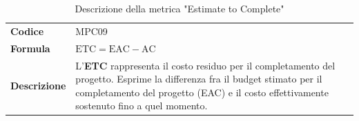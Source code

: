 \documentclass[a4paper,12pt]{article}
\begin{document}
            {\renewcommand{\arraystretch}{1.4}
            \begin{table}[H]
            \centering
            \begin{tabularx}{\textwidth}{|l|X|}
                \hline
                \rowcolor{gold}
                \multicolumn{2}{|c|}{\textbf{Estimate to Complete (ETC)}}\\
                \hline
                \textbf{Codice} & MPC09\\
                \hline
                \textbf{Formula} & \( \displaystyle \text{ETC} = \text{EAC}-\text{AC} \)\\
                \hline
                \textbf{Descrizione} & L'\textbf{ETC} rappresenta il costo residuo per il completamento del progetto. Esprime la differenza fra il budget stimato per il completamento del progetto (EAC) e il costo effettivamente sostenuto fino a quel momento. \\
                \hline
            \end{tabularx}      
            \caption{Descrizione della metrica "Estimate to Complete"}
            \end{table}
            }
        
\end{document}

